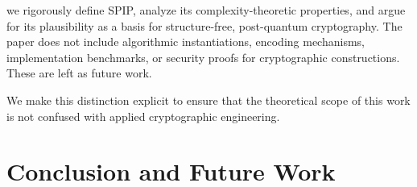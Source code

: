 \documentclass[twocolumn,10pt]{article}
\begin{document}
we rigorously define SPIP, analyze its complexity-theoretic properties, and argue for its plausibility as a basis for structure-free, post-quantum cryptography. The paper does not include algorithmic instantiations, encoding mechanisms, implementation benchmarks, or security proofs for cryptographic constructions. These are left as future work.

We make this distinction explicit to ensure that the theoretical scope of this work is not confused with applied cryptographic engineering.

\section{Conclusion and Future Work} \label{sec:conclusion}
\vspace{0.8em}
\end{document}
